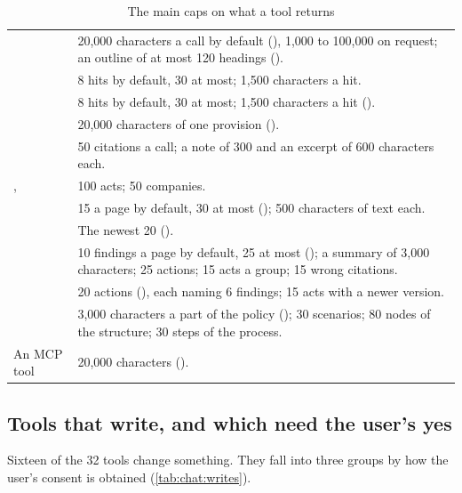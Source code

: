 \begin{table}[H]
\caption{The main caps on what a tool returns}\label{tab:chat:caps}
\begin{tabularx}{\textwidth}{@{}L{40mm}Y@{}}
\toprule
{} &  \\
\midrule
{} & 20,000 characters a call by default (), 1,000 to 100,000 on request; an outline of at most 120 headings (). \\
 & 8 hits by default, 30 at most; 1,500 characters a hit. \\
 & 8 hits by default, 30 at most; 1,500 characters a hit (). \\
 & 20,000 characters of one provision (). \\
 & 50 citations a call; a note of 300 and an excerpt of 600 characters each. \\
,  & 100 acts; 50 companies. \\
 & 15 a page by default, 30 at most (); 500 characters of text each. \\
 & The newest 20 (). \\
 & 10 findings a page by default, 25 at most (); a summary of 3,000 characters; 25 actions; 15 acts a group; 15 wrong citations. \\
 & 20 actions (), each naming 6 findings; 15 acts with a newer version. \\
 & 3,000 characters a part of the policy (); 30 scenarios; 80 nodes of the structure; 30 steps of the process. \\
An MCP tool & 20,000 characters (). \\
\bottomrule
\end{tabularx}
\end{table}

\subsection{Tools that write, and which need the user's yes}\label{sec:chat:gates}

Sixteen of the 32 tools change something. They fall into three groups by how the user's
consent is obtained (\cref{tab:chat:writes}).

